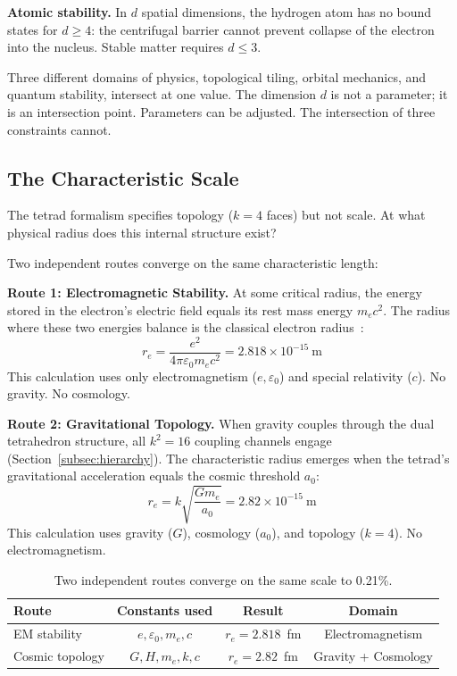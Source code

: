 \documentclass[aps,prd,preprint,superscriptaddress,showpacs,preprintnumbers,amsmath,amssymb,nofootinbib]{revtex4-2}
\begin{document}
\textbf{Atomic stability.} In $d$ spatial dimensions, the hydrogen atom has no bound states for $d \geq 4$: the centrifugal barrier cannot prevent collapse of the electron into the nucleus. Stable matter requires $d \leq 3$.

Three different domains of physics, topological tiling, orbital mechanics, and quantum stability, intersect at one value. The dimension $d$ is not a parameter; it is an intersection point. Parameters can be adjusted. The intersection of three constraints cannot.

\subsection{The Characteristic Scale}
\label{subsec:scale}

The tetrad formalism specifies topology ($k = 4$ faces) but not scale. At what physical radius does this internal structure exist?

Two independent routes converge on the same characteristic length:

\textbf{Route 1: Electromagnetic Stability.} At some critical radius, the energy stored in the electron's electric field equals its rest mass energy $m_e c^2$. The radius where these two energies balance is the classical electron radius~\cite{jackson1999}:
\begin{equation}
r_e = \frac{e^2}{4\pi\varepsilon_0 m_e c^2} = 2.818 \times 10^{-15}~\text{m}
\end{equation}
This calculation uses only electromagnetism ($e, \varepsilon_0$) and special relativity ($c$). No gravity. No cosmology.

\textbf{Route 2: Gravitational Topology.} When gravity couples through the dual tetrahedron structure, all $k^2 = 16$ coupling channels engage (Section~\ref{subsec:hierarchy}). The characteristic radius emerges when the tetrad's gravitational acceleration equals the cosmic threshold $a_0$:
\begin{equation}
r_e = k\sqrt{\frac{Gm_e}{a_0}} = 2.82 \times 10^{-15}~\text{m}
\end{equation}
This calculation uses gravity ($G$), cosmology ($a_0$), and topology ($k = 4$). No electromagnetism.

\begin{table}[H]
\centering
\begin{tabular*}{0.95\textwidth}{@{\extracolsep{\fill}} lccc @{}}
\toprule
\textbf{Route} & \textbf{Constants used} & \textbf{Result} & \textbf{Domain} \\
\midrule
EM stability & $e, \varepsilon_0, m_e, c$ & $r_e = 2.818$~fm & Electromagnetism \\
Cosmic topology & $G, H, m_e, k, c$ & $r_e = 2.82$~fm & Gravity + Cosmology \\
\bottomrule
\end{tabular*}
\caption{Two independent routes converge on the same scale to 0.21\%.}
\label{tab:convergence}
\end{table}
\end{document}
